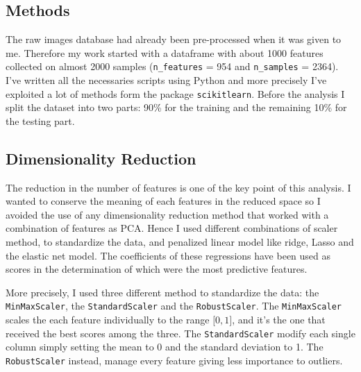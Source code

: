 \documentclass[11pt,a4paper]{report}
\begin{document}


\subsection*{Methods}


The raw images database had already been pre-processed when it was given to me. Therefore my work started with a dataframe with about 1000 features collected on almost 2000 samples (\texttt{n\_features} = 954 and \texttt{n\_samples} = 2364). I've written all the necessaries scripts using Python and more precisely I've exploited a lot of methods form the package \texttt{scikitlearn}. Before the analysis I split the dataset into two parts: 90\% for the training and the remaining 10\% for the testing part.

\subsection*{Dimensionality Reduction}
The reduction in the number of features is one of the key point of this analysis. I wanted to conserve the meaning of each features in the reduced space so I avoided the use of any dimensionality reduction method that worked with a combination of features as PCA. Hence I used different combinations of scaler method, to standardize the data, and penalized linear model like ridge, Lasso and the elastic net model. The coefficients of these regressions have been used as scores in the determination of which were the most predictive features.

More precisely, I used three different method to standardize the data: the \texttt{MinMaxScaler}, the \texttt{StandardScaler} and the \texttt{RobustScaler}. The \texttt{MinMaxScaler} scales the each feature individually to the range $\lbrack 0,1 \rbrack$, and it's the one that received the best scores among the three. The \texttt{StandardScaler} modify each single column simply setting the mean to 0 and the standard deviation to 1. The \texttt{RobustScaler} instead, manage every feature giving less importance to outliers.
\end{document}
